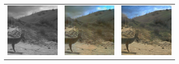 \documentclass[a4paper,11pt, DIV=12]{scrartcl}
\begin{document}
\begin{figure}[ht]
\begin{subfigure}{0.63\textwidth}
\begin{tabularx}{1\textwidth}{>{\centering\arraybackslash}X >{\centering\arraybackslash}X >{\centering\arraybackslash}X}
         \includegraphics{586e2e43-23d2-11e8-a6a3-ec086b02610b_real.png} & \includegraphics{586e2e43-23d2-11e8-a6a3-ec086b02610b_cycle_gan.png} & \includegraphics{586e2e43-23d2-11e8-a6a3-ec086b02610b_cut.png} \\

\end{tabularx}
\end{subfigure}
\end{figure}
\end{document}
